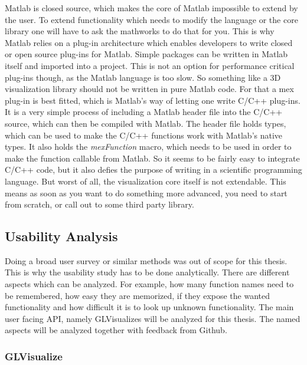 Matlab is closed source, which makes the core of Matlab impossible to extend by the user. 
To extend functionality which needs to modify the language or the core library one will have to ask the mathworks to do that for you.
This is why Matlab relies on a plug-in architecture which enables developers to write closed or open source plug-ins for Matlab. 
Simple packages can be written in Matlab itself and imported into a project.
This is not an option for performance critical plug-ins though, as the Matlab language is too slow.
So something like a 3D visualization library should not be written in pure Matlab code.
For that a mex plug-in is best fitted, which is Matlab's way of letting one write C/C++ plug-ins.
It is a very simple process of including a Matlab header file into the C/C++ source, which can then be compiled with Matlab.
The header file holds types, which can be used to make the C/C++ functions work with Matlab's native types.
It also holds the \textit{mexFunction} macro, which needs to be used in order to make the function callable from Matlab.
So it seems to be fairly easy to integrate C/C++ code, but it also defies the purpose of writing in a scientific programming language.
But worst of all, the visualization core itself is not extendable. This means as soon as you want to do something more advanced, you need to start from scratch, or call out to some third party library.


\subsection{Usability Analysis}
Doing a broad user survey or similar methods was out of scope for this thesis.
This is why the usability study has to be done analytically.
There are different aspects which can be analyzed. For example, how many function names need to be remembered, how easy they are memorized, if they expose the wanted functionality and how difficult it is to look up unknown functionality.
The main user facing \ac{API}, namely GLVisualizes will be analyzed for this thesis. 
The named aspects will be analyzed together with feedback from Github.

\subsubsection{GLVisualize}


